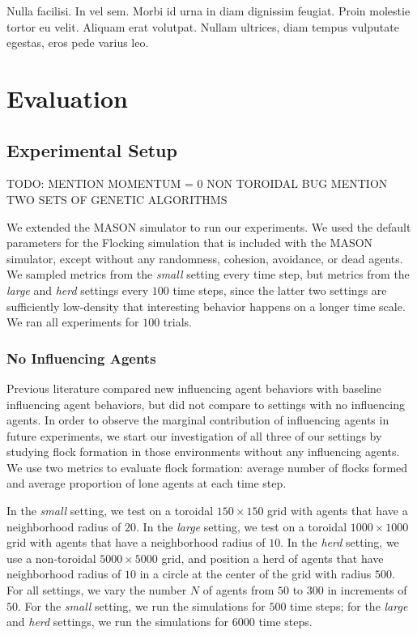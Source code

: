 \begin{savequote}[75mm]
Nulla facilisi. In vel sem. Morbi id urna in diam dignissim feugiat. Proin molestie tortor eu velit. Aliquam erat volutpat. Nullam ultrices, diam tempus vulputate egestas, eros pede varius leo.
\end{savequote}

\chapter{Evaluation}
\label{ch:evaluation}

\section{Experimental Setup}

TODO: MENTION MOMENTUM = 0 NON TOROIDAL BUG
MENTION TWO SETS OF GENETIC ALGORITHMS

We extended the MASON simulator to run our experiments.\cite{luke05mason}
We used the default parameters for the Flocking simulation that is included
with the MASON simulator, except without any randomness, cohesion, avoidance,
or dead agents.
We sampled metrics from the \textit{small} setting every time step, but metrics
from the \textit{large} and \textit{herd} settings every $100$ time steps,
since the latter two settings are sufficiently low-density that interesting
behavior happens on a longer time scale.
We ran all experiments for $100$ trials.

\subsection{No Influencing Agents}
Previous literature compared new influencing agent behaviors with baseline
influencing agent behaviors, but did not compare to settings with no
influencing agents.
In order to observe the marginal contribution of influencing agents
in future experiments, we start our investigation of all three of our settings
by studying flock formation in those environments without any influencing
agents.
We use two metrics to evaluate flock formation: average number of flocks
formed and average proportion of lone agents at each time step.

In the \textit{small} setting, we test on a toroidal $150\times150$ grid with
agents that have a neighborhood radius of $20$.
In the \textit{large} setting, we test on a toroidal $1000\times1000$ grid with
agents that have a neighborhood radius of $10$.
In the \textit{herd} setting, we use a non-toroidal $5000\times5000$ grid, and
position a herd of agents that have neighborhood radius of $10$ in a circle at
the center of the grid with radius $500$.
For all settings, we vary the number $N$ of agents from $50$ to $300$ in
increments of $50$.
For the \textit{small} setting, we run the simulations for $500$ time steps;
for the \textit{large} and \textit{herd} settings, we run the simulations for
$6000$ time steps.

